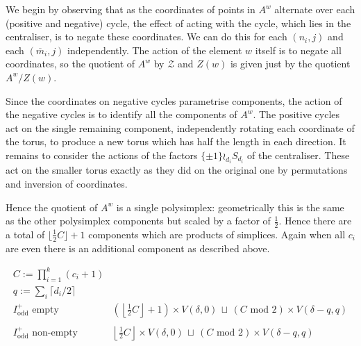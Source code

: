 \documentclass[11pt,a4paper]{article}
\def\mbar{\overline{m}}
\def\cZ{\mathcal{Z}}
\def\cZ{{\mathcal Z}}
\def\mbar{\overline{m}}
\def\odd{\mathrm{odd}}
\begin{document}
We begin by observing that as the coordinates of points in $A^w$ alternate over each (positive and negative) cycle, the effect of acting with the cycle, which lies in the centraliser, is to negate these coordinates.  We can do this for each $(n_i,j)$ and each $(\mbar_i,j)$ independently. The action of the element $w$ itself is to negate all coordinates, so the quotient of  $A^w$ by $\cZ$ and $Z(w)$ is given just by the quotient $A^w/Z(w)$.

Since the coordinates on negative cycles parametrise components, the action of the negative cycles is to identify all the components of $A^w$. The positive cycles act on the single remaining component, independently rotating each coordinate of the torus, to produce a new torus which has half the length in each direction. It remains to consider the actions of the factors $\{\pm 1\}\wr_{d_i} S_{d_i}$ of the centraliser. These act on the smaller torus exactly as they did on the original one by permutations and inversion of coordinates.

Hence the quotient of $A^w$ is a single polysimplex: geometrically this is the same as the other polysimplex components but scaled by a factor of $\frac 12$. Hence there are a total of $\lfloor \frac 12 C\rfloor+1$ components which are products of simplices. Again when all  $c_i$ are even there is an additional component as described above.

\bigskip

\begin{table}[h]
  \[
\begin{array}{c|c}
 C:=\prod_{i=1}^k (c_i+1) & \\
 q:=\sum_i \lceil d_i/2\rceil & \\
  \hline
 I^+_\odd\text{ empty} &  \left(\left\lfloor\frac 12C \right\rfloor+1\right)\times V(\delta,0)\,\sqcup\, (C\text{ mod } 2)\times V(\delta-q,q)\\
  &\\
I^+_\odd\text{ non-empty}   &  \left\lfloor\frac 12C \right\rfloor\times V(\delta,0)\,\sqcup\, (C\text{ mod } 2)\times V(\delta-q,q)\\
\end{array}
\]

    \bigskip
    
    \caption{\label{adjoint_C_n_sectors}The structure of a sector for the adjoint form of $C_n$}

\end{table}
\end{document}
